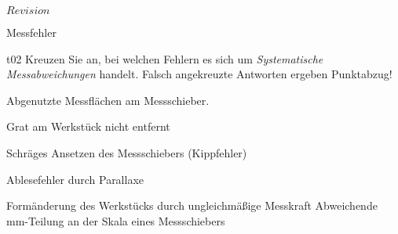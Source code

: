 \RCS $Revision$
\begin{aufgabe}[Technologie]{Messfehler}
  \begin{teilaufgabe}[ohnenummer]{t}{0}{2}
     Kreuzen Sie an, bei welchen Fehlern es sich um
     \textit{Systematische Messabweichungen} handelt. Falsch
     angekreuzte Antworten ergeben Punktabzug!
     \begin{multicols}{2}
         \begin{mch}[3]
             \itemx Abgenutzte Messflächen am Messschieber.
             \item Grat am Werkstück nicht entfernt
             \item Schräges Ansetzen des Messschiebers (Kippfehler)
             \item Ablesefehler durch Parallaxe
             \item Formänderung des Werkstücks durch ungleichmäßige Messkraft
             \itemx Abweichende mm-Teilung an der Skala eines Messschiebers
         \end{mch}
     \end{multicols}
  \end{teilaufgabe}
  \begin{loesung}
  \end{loesung}
\end{aufgabe}


